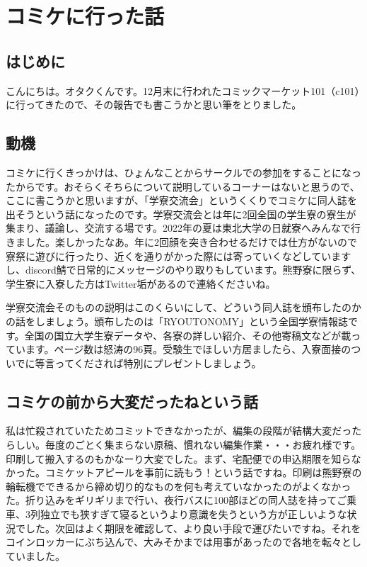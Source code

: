 \section{コミケに行った話}\label{sec:comiket}


\subsection{はじめに}
  こんにちは。オタクくんです。12月末に行われたコミックマーケット101（c101）に行ってきたので、その報告でも書こうかと思い筆をとりました。

\subsection{動機}
  コミケに行くきっかけは、ひょんなことからサークルでの参加をすることになったからです。おそらくそちらについて説明しているコーナーはないと思うので、ここに書こうかと思いますが、「学寮交流会」というくくりでコミケに同人誌を出そうという話になったのです。学寮交流会とは年に2回全国の学生寮の寮生が集まり、議論し、交流する場です。2022年の夏は東北大学の日就寮へみんなで行きました。楽しかったなあ。年に2回顔を突き合わせるだけでは仕方がないので寮祭に遊びに行ったり、近くを通りがかった際には寄っていくなどしていますし、discord鯖で日常的にメッセージのやり取りもしています。熊野寮に限らず、学生寮に入寮した方はTwitter垢があるので連絡くださいね。

  学寮交流会そのものの説明はこのくらいにして、どういう同人誌を頒布したのかの話をしましょう。頒布したのは「RYOUTONOMY」という全国学寮情報誌です。全国の国立大学生寮データや、各寮の詳しい紹介、その他寄稿文などが載っています。ページ数は怒涛の96頁。受験生でほしい方居ましたら、入寮面接のついでに等言ってくだされば特別にプレゼントしましょう。

\subsection{コミケの前から大変だったねという話}
  私は忙殺されていたためコミットできなかったが、編集の段階が結構大変だったらしい。毎度のごとく集まらない原稿、慣れない編集作業・・・お疲れ様です。印刷して搬入するのもかなーり大変でした。まず、宅配便での申込期限を知らなかった。コミケットアピールを事前に読もう！という話ですね。印刷は熊野寮の輪転機でできるから締め切り的なものを何も考えていなかったのがよくなかった。折り込みをギリギリまで行い、夜行バスに100部ほどの同人誌を持ってご乗車、3列独立でも狭すぎて寝るというより意識を失うという方が正しいような状況でした。次回はよく期限を確認して、より良い手段で運びたいですね。それをコインロッカーにぶち込んで、大みそかまでは用事があったので各地を転々としていました。

